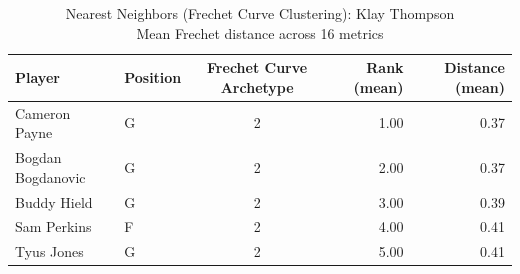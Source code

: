 \begin{table}[t]
\caption*{
{\fontsize{20}{25} Nearest Neighbors (Frechet Curve Clustering): Klay Thompson\fontsize{12}{15}\selectfont } \\ 
{\fontsize{14}{17}\selectfont  Mean Frechet distance across 16 metrics\fontsize{12}{15}\selectfont }
} 
\fontsize{12.0pt}{14.0pt}\selectfont
\begin{tabular*}{\linewidth}{@{\extracolsep{\fill}}llcrr}
\toprule
Player & Position & Frechet Curve Archetype & Rank (mean) & Distance (mean) \\ 
\midrule\addlinespace[2.5pt]
Cameron Payne & G & 2 & 1.00 & 0.37 \\ 
Bogdan Bogdanovic & G & 2 & 2.00 & 0.37 \\ 
Buddy Hield & G & 2 & 3.00 & 0.39 \\ 
Sam Perkins & F & 2 & 4.00 & 0.41 \\ 
Tyus Jones & G & 2 & 5.00 & 0.41 \\ 
\bottomrule
\end{tabular*}
\end{table}

